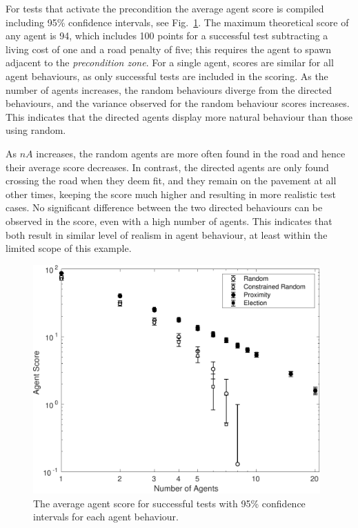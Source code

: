 \documentclass[runningheads,a4paper]{llncs}
\begin{document}
For tests that activate the precondition the average agent score is compiled including 95\% confidence intervals, see Fig.~\ref{f:agentscore}. The maximum theoretical score of any agent is 94, which includes 100 points for a successful test subtracting a living cost of one and a road penalty of five; this requires the agent to spawn adjacent to the \textit{precondition zone}. For a single agent, scores are similar for all agent behaviours, as only successful tests are included in the scoring. As the number of agents increases, the random behaviours diverge from the directed behaviours, and the variance observed for the random behaviour scores increases. This indicates that the directed agents display more natural behaviour than those using random.

As $nA$ increases, the random agents are more often found in the road and hence their average score decreases. In contrast, the directed agents are only found crossing the road when they deem fit, and they remain on the pavement at all other times, keeping the score much higher and resulting in more realistic test cases. No significant difference between the two directed behaviours can be observed in the score, even with a high number of agents. This indicates that  both result in similar level of realism in agent behaviour, at least within the limited scope of this example.


\begin{figure}[!t]
	\centering
\includegraphics[width=0.98\textwidth]{AgentScore.pdf}
	\caption{The average agent score for successful tests with 95\% confidence intervals for each agent behaviour.}
	\label{f:agentscore}
\end{figure}
\end{document}

